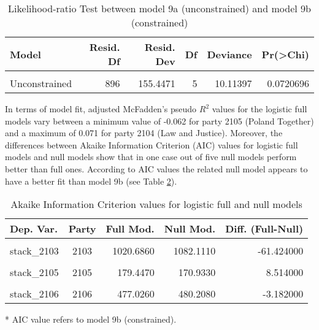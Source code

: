 \documentclass[
]{article}
\begin{document}
\begin{table}[!h]

\caption{\label{tab:unnamed-chunk-138}Likelihood-ratio Test between model 9a (unconstrained) and model 9b (constrained)
                  \label{table:lrtest_1_pl}}
\centering
\begin{tabular}[t]{l|r|r|r|r|r}
\hline
Model & Resid. Df & Resid. Dev & Df & Deviance & Pr(>Chi)\\
\hline
\cellcolor{gray!6}{Constrained} & \cellcolor{gray!6}{901} & \cellcolor{gray!6}{165.5611} & \cellcolor{gray!6}{} & \cellcolor{gray!6}{} & \cellcolor{gray!6}{}\\
\hline
Unconstrained & 896 & 155.4471 & 5 & 10.11397 & 0.0720696\\
\hline
\end{tabular}
\end{table}

In terms of model fit, adjusted McFadden's pseudo \(R^2\) values for the logistic full models vary between
a minimum value of
-0.062
for party 2105
(Poland Together)
and a maximum of
0.071
for party 2104
(Law and Justice).
Moreover, the differences between Akaike Information Criterion (AIC) values for logistic full models and
null models show that in one case out of five null models perform better than full ones. According to AIC
values the related null model appears to have a better fit than model 9b (see Table \ref{table:logit_aic_pl}).

\begin{table}[!h]

\caption{\label{tab:unnamed-chunk-139}Akaike Information Criterion values for logistic full and null models 
        \label{table:logit_aic_pl}}
\centering
\begin{threeparttable}
\begin{tabular}[t]{lcrrr}
\toprule
Dep. Var. & Party & Full Mod. & Null Mod. & Diff. (Full-Null)\\
\midrule
\cellcolor{gray!6}{stack\_2102} & \cellcolor{gray!6}{2102} & \cellcolor{gray!6}{544.1240} & \cellcolor{gray!6}{548.0700} & \cellcolor{gray!6}{-3.946000}\\
stack\_2103 & 2103 & 1020.6860 & 1082.1110 & -61.424000\\
\cellcolor{gray!6}{stack\_2104} & \cellcolor{gray!6}{2104} & \cellcolor{gray!6}{946.7780} & \cellcolor{gray!6}{1020.9980} & \cellcolor{gray!6}{-74.219000}\\
stack\_2105 & 2105 & 179.4470 & 170.9330 & 8.514000\\
\cellcolor{gray!6}{stack\_2105*} & \cellcolor{gray!6}{2105} & \cellcolor{gray!6}{179.5611} & \cellcolor{gray!6}{170.9328} & \cellcolor{gray!6}{8.628321}\\
\addlinespace
stack\_2106 & 2106 & 477.0260 & 480.2080 & -3.182000\\
\bottomrule
\end{tabular}
\begin{tablenotes}[para]
\item[*] AIC value refers to model 9b (constrained).
\end{tablenotes}
\end{threeparttable}
\end{table}
\end{document}
